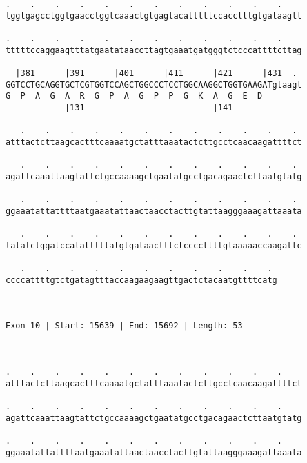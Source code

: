 \documentclass{article}
\begin{document}
\begin{Verbatim}
.    .    .    .    .    .    .    .    .    .    .    .    
tggtgagcctggtgaacctggtcaaactgtgagtacatttttccacctttgtgataagtt
                                                            
.    .    .    .    .    .    .    .    .    .    .    .    
tttttccaggaagtttatgaatataaccttagtgaaatgatgggtctcccattttcttag
                                                            
  |381      |391      |401      |411      |421      |431  . 
GGTCCTGCAGGTGCTCGTGGTCCAGCTGGCCCTCCTGGCAAGGCTGGTGAAGATgtaagt
G  P  A  G  A  R  G  P  A  G  P  P  G  K  A  G  E  D        
            |131                          |141              
  
   .    .    .    .    .    .    .    .    .    .    .    . 
atttactcttaagcactttcaaaatgctatttaaatactcttgcctcaacaagattttct
                                                            
   .    .    .    .    .    .    .    .    .    .    .    . 
agattcaaattaagtattctgccaaaagctgaatatgcctgacagaactcttaatgtatg
                                                            
   .    .    .    .    .    .    .    .    .    .    .    . 
ggaaatattattttaatgaaatattaactaacctacttgtattaagggaaagattaaata
                                                            
   .    .    .    .    .    .    .    .    .    .    .    . 
tatatctggatccatatttttatgtgataactttctccccttttgtaaaaaccaagattc
                                                            
   .    .    .    .    .    .    .    .    .    .    . 
ccccattttgtctgatagtttaccaagaagaagttgactctacaatgttttcatg
                                                       
                                                       
 
Exon 10 | Start: 15639 | End: 15692 | Length: 53



.    .    .    .    .    .    .    .    .    .    .    .    
atttactcttaagcactttcaaaatgctatttaaatactcttgcctcaacaagattttct
                                                            
.    .    .    .    .    .    .    .    .    .    .    .    
agattcaaattaagtattctgccaaaagctgaatatgcctgacagaactcttaatgtatg
                                                            
.    .    .    .    .    .    .    .    .    .    .    .    
ggaaatattattttaatgaaatattaactaacctacttgtattaagggaaagattaaata
                                                            

\end{Verbatim}
\end{document}
